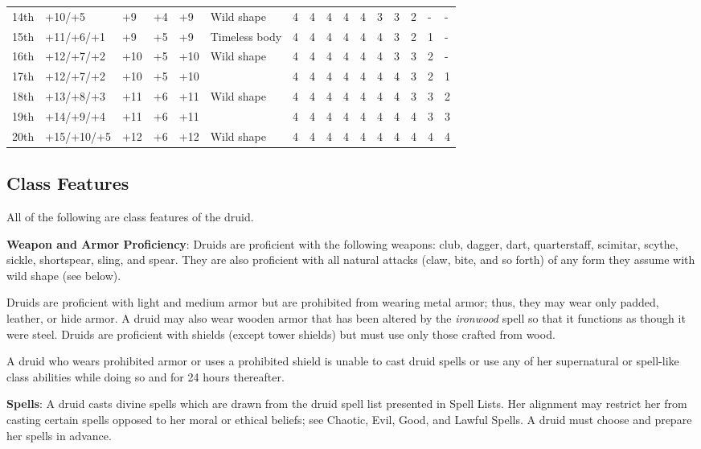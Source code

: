 \begin{table}[]
\begin{tabularx}{\linewidth}{lp{6em}p{2.5em}p{2.5em}p{2.5em}Xllllllllll}
14th & +10/+5 & +9 & +4 & +9 & Wild shape & 4 & 4 & 4 & 4 & 4 & 3 & 3 & 2 & - & -\\
15th & +11/+6/+1 & +9 & +5 & +9 & Timeless body & 4 & 4 & 4 & 4 & 4 & 4 & 3 & 2 & 1 & -\\
16th & +12/+7/+2 & +10 & +5 & +10 & Wild shape & 4 & 4 & 4 & 4 & 4 & 4 & 3 & 3 & 2 & -\\
17th & +12/+7/+2 & +10 & +5 & +10 &  & 4 & 4 & 4 & 4 & 4 & 4 & 4 & 3 & 2 & 1\\
18th & +13/+8/+3 & +11 & +6 & +11 & Wild shape & 4 & 4 & 4 & 4 & 4 & 4 & 4 & 3 & 3 & 2\\
19th & +14/+9/+4 & +11 & +6 & +11 &  & 4 & 4 & 4 & 4 & 4 & 4 & 4 & 4 & 3 & 3\\
20th & +15/+10/+5 & +12 & +6 & +12 & Wild shape & 4 & 4 & 4 & 4 & 4 & 4 & 4 & 4 & 4 & 4\\
\end{tabularx}
\end{table}


				
\subsection{Class Features}

				
All of the following are class features of the druid.
				
\textbf{Weapon and Armor Proficiency}: Druids are proficient with the following weapons: club, dagger, dart, quarterstaff, scimitar, scythe, sickle, shortspear, sling, and spear. They are also proficient with all natural attacks (claw, bite, and so forth) of any form they assume with wild shape (see below).
				
Druids are proficient with light and medium armor but are prohibited from wearing metal armor; thus, they may wear only padded, leather, or hide armor. A druid may also wear wooden armor that has been altered by the \textit{ironwood} spell so that it functions as though it were steel. Druids are proficient with shields (except tower shields) but must use only those crafted from wood.
				
A druid who wears prohibited armor or uses a prohibited shield is unable to cast druid spells or use any of her supernatural or spell-like class abilities while doing so and for 24 hours thereafter.
				
\textbf{Spells}: A druid casts divine spells which are drawn from the druid spell list presented in Spell Lists. Her alignment may restrict her from casting certain spells opposed to her moral or ethical beliefs; see Chaotic, Evil, Good, and Lawful Spells. A druid must choose and prepare her spells in advance.
				

